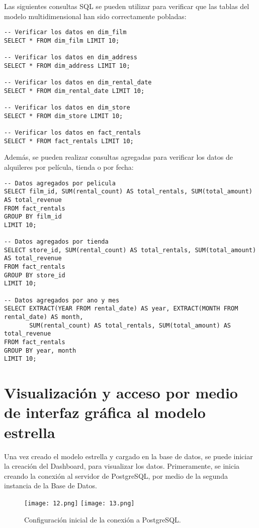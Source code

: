\documentclass{article}
\begin{document}
Las siguientes consultas SQL se pueden utilizar para verificar que las tablas del modelo multidimensional han sido correctamente pobladas:

\begin{lstlisting}
-- Verificar los datos en dim_film
SELECT * FROM dim_film LIMIT 10;

-- Verificar los datos en dim_address
SELECT * FROM dim_address LIMIT 10;

-- Verificar los datos en dim_rental_date
SELECT * FROM dim_rental_date LIMIT 10;

-- Verificar los datos en dim_store
SELECT * FROM dim_store LIMIT 10;

-- Verificar los datos en fact_rentals
SELECT * FROM fact_rentals LIMIT 10;
\end{lstlisting}

Además, se pueden realizar consultas agregadas para verificar los datos de alquileres por película, tienda o por fecha:

\begin{lstlisting}
-- Datos agregados por pelicula
SELECT film_id, SUM(rental_count) AS total_rentals, SUM(total_amount) AS total_revenue
FROM fact_rentals
GROUP BY film_id
LIMIT 10;

-- Datos agregados por tienda
SELECT store_id, SUM(rental_count) AS total_rentals, SUM(total_amount) AS total_revenue
FROM fact_rentals
GROUP BY store_id
LIMIT 10;

-- Datos agregados por ano y mes
SELECT EXTRACT(YEAR FROM rental_date) AS year, EXTRACT(MONTH FROM rental_date) AS month, 
       SUM(rental_count) AS total_rentals, SUM(total_amount) AS total_revenue
FROM fact_rentals
GROUP BY year, month
LIMIT 10;
\end{lstlisting}

\newpage
\section{Visualización y acceso por medio de interfaz gráfica al modelo estrella}

Una vez creado el modelo estrella y cargado en la base de datos, se puede iniciar la creación del Dashboard, para visualizar los datos. Primeramente, se inicia creando la conexión al servidor de PostgreSQL, por medio de la segunda instancia de la Base de Datos.

\begin{figure}[h]
\centering
\texttt{[image: 12.png]}
\hfill
\texttt{[image: 13.png]}
\caption{Configuración inicial de la conexión a PostgreSQL.}
\end{figure}
\end{document}
